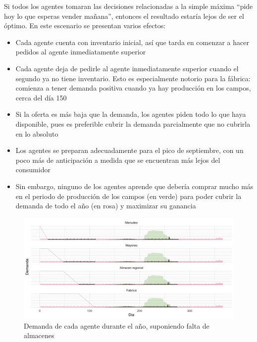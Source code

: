 Si todos los agentes tomaran las decisiones relacionadas a la simple m\'axima ``pide hoy lo que esperas vender ma\~nana'', entonces el resultado estar\'ia lejos de ser el \'optimo.
En este escenario se presentan varios efectos: 
\begin{itemize}
    \item Cada agente cuenta con inventario inicial, as\'i que tarda en comenzar a hacer pedidos al agente inmediatamente superior
    \item Cada agente deja de pedirle al agente inmediatamente superior cuando el segundo ya no tiene inventario. Esto es especialmente notorio para la f\'abrica: comienza a tener demanda positiva cuando ya hay producci\'on en los campos, cerca del d\'ia 150
    \item Si la oferta es m\'as baja que la demanda, los agentes piden todo lo que haya disponible, pues es preferible cubrir la demanda parcialmente que no cubrirla en lo absoluto
    \item Los agentes se preparan adecuadamente para el pico de septiembre, con un poco m\'as de anticipaci\'on a medida que se encuentran m\'as lejos del consumidor
    \item Sin embargo, ninguno de los agentes aprende que deber\'ia comprar mucho m\'as en el periodo de producci\'on de los campos (en verde) para poder cubrir la demanda de todo el a\~no (en rosa) y maximizar su ganancia
\end{itemize}

\begin{figure}[ht!]
\caption{Demanda de cada agente durante el a\~no, suponiendo falta de almacenes}
\label{analytic_3}
\includegraphics[width=16cm]{tesis_tex/figs/analytic_with_fields_restriction.png}
\centering
\end{figure}

